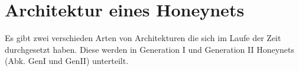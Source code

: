 \section{Architektur eines Honeynets}
Es gibt zwei verschieden Arten von Architekturen die sich im Laufe der Zeit durchgesetzt haben. Diese werden in Generation I und Generation II Honeynets (Abk. GenI und GenII) unterteilt.\\

